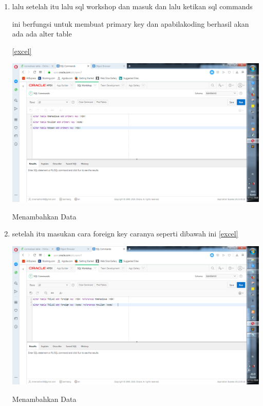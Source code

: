 \documentclass{article}
\begin{document}
\begin{enumerate}
    \item lalu setelah itu lalu sql workshop dan masuk dan lalu ketikan sql commands
    
    ini berfungsi untuk membuat primary key dan apabilakoding berhasil akan ada ada alter table
    
        \ref{excel}
    \begin{center}
    
         \centering
            \includegraphics[scale=0.27]{gambar/14.png}
        \caption{Menambahkan Data}
        \label{excel}
    \end{center}
    
\item   setelah itu masukan cara foreign key caranya seperti dibawah ini
    \ref{excel}
    \begin{center}
         \centering
            \includegraphics[scale=0.27]{gambar/15.png}
        \caption{Menambahkan Data}
        \label{excel}
    \end{center}
    

\end{enumerate}
\end{document}
